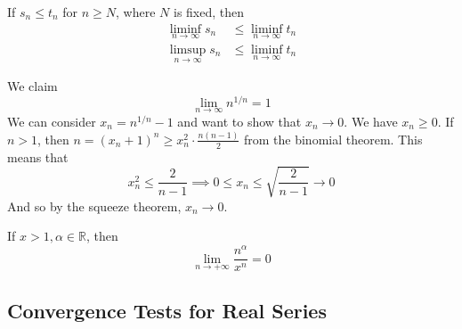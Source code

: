   \begin{theorem}
    If $s_n \leq t_n$ for $n \geq N$, where $N$ is fixed, then 
    \begin{align*}
      \liminf_{n \rightarrow \infty} s_n & \leq \liminf_{n \rightarrow \infty} t_n \\
      \limsup_{n \rightarrow \infty} s_n & \leq \liminf_{n \rightarrow \infty} t_n 
    \end{align*}
  \end{theorem} 

  \begin{example}
    We claim 
    \begin{equation}
      \lim_{n \rightarrow \infty} n^{1/n} = 1 
    \end{equation}
    We can consider $x_n = n^{1/n} - 1$ and want to show that $x_n \rightarrow 0$. We have $x_n \geq 0$. If $n > 1$, then $n = (x_n + 1)^n \geq x_n^2 \cdot \frac{n(n - 1)}{2}$ from the binomial theorem. This means that 
    \begin{equation}
      x_n^2 \leq \frac{2}{n-1} \implies 0 \leq x_n \leq \sqrt{\frac{2}{n-1}} \rightarrow 0
    \end{equation}
    And so by the squeeze theorem, $x_n \rightarrow 0$. 
  \end{example}

  \begin{example}
    If $x > 1, \alpha \in \mathbb{R}$, then 
    \begin{equation}
      \lim_{n \rightarrow +\infty} \frac{n^\alpha}{x^n} = 0
    \end{equation} 
  \end{example}
 
\subsection{Convergence Tests for Real Series}

